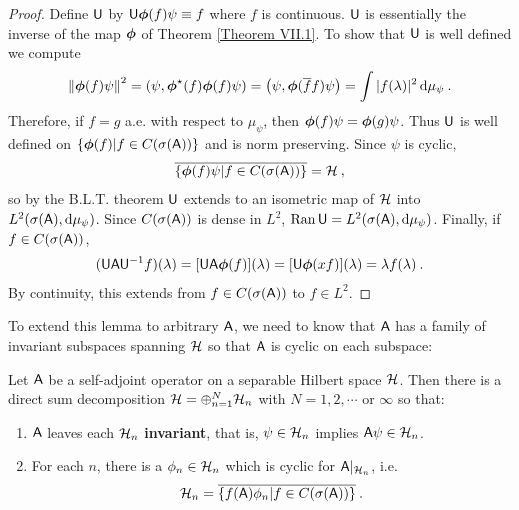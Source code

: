 \begin{proof}
    Define $\mathsf{U}$ by $\mathsf{U} \boldsymbol{\phi}(f) \psi \equiv f$ where $f$ is continuous. $\mathsf{U}$ is essentially the inverse of the map $\boldsymbol{\phi}$ of Theorem \ref{Theorem VII.1}. To show that $\mathsf{U}$ is well defined we compute
    \begin{align}
        \left \Vert \boldsymbol{\phi}(f) \psi \right \Vert^2 = \left( \psi, \boldsymbol{\phi}^\star (f) \boldsymbol{\phi}(f) \psi \right) = \left( \psi, \boldsymbol{\phi} (\overline{f} f) \psi \right) = \int |f(\lambda)|^2 \, \mathrm{d} \mu_\psi \:.
    \end{align}
    Therefore, if $f=g$ a.e. with respect to $\mu_\psi$, then $\boldsymbol{\phi}(f) \psi = \boldsymbol{\phi}(g) \psi$. Thus $\mathsf{U}$ is well defined on $\left \lbrace \boldsymbol{\phi}(f) | f \in C (\sigma (\mathsf{A})) \right \rbrace$ and is norm preserving. Since $\psi$ is cyclic, \begin{align}
        \overline{ \left \lbrace  \boldsymbol{\phi}(f) \psi | f \in C (\sigma (\mathsf{A}))   \right \rbrace } = \mathcal{H} \:,
    \end{align}
    so by the B.L.T. theorem $\mathsf{U}$ extends to an isometric map of $\mathcal{H}$ into $L^{2}(\sigma(\mathsf{A}), \mathrm{d} \mu_\psi)$. Since $C(\sigma (\mathsf{A}))$ is dense in $L^2$, $\mathrm{Ran}\, \mathsf{U} = L^{2}(\sigma(\mathsf{A}), \mathrm{d} \mu_\psi)$. Finally, if $f \in C(\sigma (\mathsf{A}))$, \begin{align}
        (\mathsf{U} \mathsf{A} \mathsf{U}^{-1} f )(\lambda) = [\mathsf{U} \mathsf{A} \boldsymbol{\phi}(f)](\lambda) = [\mathsf{U} \boldsymbol{\phi}(xf)](\lambda) = \lambda f (\lambda) \:.
    \end{align}
    By continuity, this extends from $f \in C(\sigma (\mathsf{A}))$ to $f \in L^2$.
\end{proof}

To extend this lemma to arbitrary $\mathsf{A}$, we need to know that $\mathsf{A}$ has a family of invariant subspaces spanning $\mathcal{H}$ so that $\mathsf{A}$ is cyclic on each subspace:

\begin{lemma}
    Let $\mathsf{A}$ be a self-adjoint operator on a separable Hilbert space $\mathcal{H}$. Then there is a direct sum decomposition $\mathcal{H} = \oplus_{n=1}^N \mathcal{H}_n$ with $N=1,2, \cdots $ or $\infty$ so that:
    \begin{enumerate}
        \item $\mathsf{A}$ leaves each $\mathcal{H}_n$ \textbf{invariant}, that is, $\psi \in \mathcal{H}_n$ implies $\mathsf{A} \psi \in \mathcal{H}_n$.
        \item For each $n$, there is a $\phi_n \in \mathcal{H}_n$ which is cyclic for $\mathsf{A} |_{\mathcal{H}_n}$, i.e.
        \begin{align}
            \mathcal{H}_n = \overline{ \left \lbrace  f(\mathsf{A}) \phi_n | f \in C(\sigma (\mathsf{A}))  \right \rbrace } \:.
        \end{align}
    \end{enumerate} 
\end{lemma}

